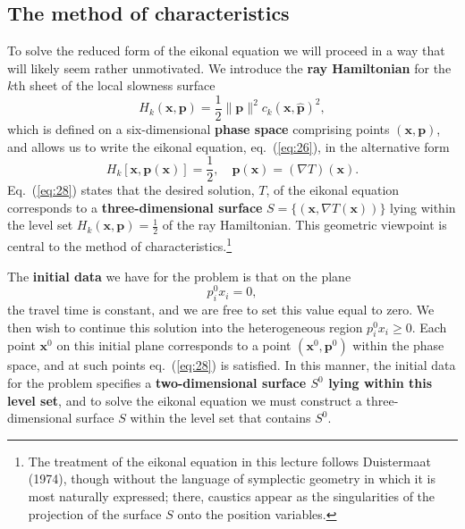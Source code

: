 \subsection*{The method of characteristics}
To solve the reduced form of the eikonal equation we will proceed in a way that will likely seem rather unmotivated. We 
introduce the \textbf{ray Hamiltonian} for the $k$th sheet of the local slowness surface
\begin{equation}
H_{k}(\mathbf{x},\mathbf{p})=\frac{1}{2}\|\mathbf{p}\|^{2}c_{k}(\mathbf{x},\hat{\mathbf{p}})^{2},
\label{eq:27}
\end{equation}
which is defined on a six-dimensional \textbf{phase space} comprising points $(\mathbf{x}, \mathbf{p})$, and allows us 
to write the eikonal equation, eq.~(\ref{eq:26}), in the alternative form
\begin{equation}
H_{k}[\mathbf{x},\mathbf{p}(\mathbf{x})]=\frac{1}{2}, \quad \mathbf{p}(\mathbf{x})=(\nabla T)(\mathbf{x}).
\label{eq:28}
\end{equation}
Eq.~(\ref{eq:28}) states that the desired solution, $T$, of the eikonal equation corresponds to a \textbf{three-dimensional surface} $S=\{(\mathbf{x},\nabla T(\mathbf{x}))\}$ lying within 
 the level set $H_{k}(\mathbf{x},\mathbf{p})=\frac{1}{2}$ of the ray Hamiltonian. This 
geometric viewpoint is central to the method of characteristics.\footnote{The treatment of the eikonal equation in this lecture follows Duistermaat (1974), though without the language of symplectic geometry in which it is most naturally expressed; there, caustics appear as the singularities of the projection of the surface $S$ onto the position variables.}

The \textbf{initial data} we have for the problem is that on the plane
\begin{equation}
p_{i}^{0}x_{i}=0, 
\label{eq:29}
\end{equation}
the travel time is constant, and we are free to set this value equal to zero. We then wish to continue this solution into 
the heterogeneous region $p_{i}^{0}x_{i}\ge0$. 
Each point $\mathbf{x}^{0}$ on this initial plane corresponds to a point $(\mathbf{x}^{0},\mathbf{p}^{0})$ within the phase space, 
and at such points eq.~(\ref{eq:28}) is satisfied.
In this manner, the initial data for the problem specifies a \textbf{two-dimensional surface $S^{0}$ lying within this level set}, and to 
solve the eikonal equation we must construct
 a three-dimensional surface $S$ within the level set that contains $S^{0}$.

